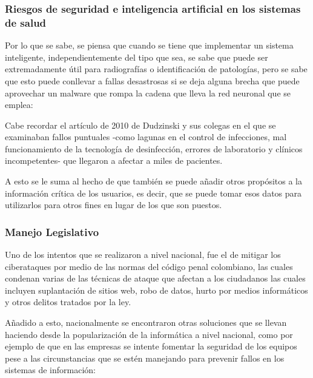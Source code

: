 \subsubsection{
  Riesgos de seguridad e inteligencia artificial en los sistemas de salud
}

Por lo que se sabe, se piensa que cuando se tiene que implementar un sistema
inteligente, independientemente del tipo que sea, se sabe que puede ser
extremadamente útil para radiografías o identificación de patologías, pero se
sabe que esto puede conllevar a fallas desastrosas si se deja alguna brecha que
puede aprovechar un malware que rompa la cadena que lleva la red neuronal que
se emplea:

\begin{displayquote}
  Cabe recordar el artículo de 2010 de Dudzinski y sus colegas en el que se
  examinaban fallos puntuales -como lagunas en el control de infecciones, mal
  funcionamiento de la tecnología de desinfección, errores de laboratorio y
  clínicos incompetentes- que llegaron a afectar a miles de pacientes.
  \parencite{Banja2020}
\end{displayquote}

A esto se le suma al hecho de que también se puede añadir otros propósitos a la
información crítica de los usuarios, es decir, que se puede tomar esos datos
para utilizarlos para otros fines en lugar de los que son puestos.
\parencite{Banja2020}

\subsubsection{Manejo Legislativo}

Uno de los intentos que se realizaron a nivel nacional, fue el de mitigar los
ciberataques por medio de las normas del código penal colombiano, las cuales
condenan varias de las técnicas de ataque que afectan a los ciudadanos las
cuales incluyen suplantación de sitios web, robo de datos, hurto por medios
informáticos y otros delitos tratados por la ley. \parencite[Ley 1273 de 2009.
Por medio de la cual se modifica el Código Penal, se crea un nuevo bien jurídico
tutelado - denominado “de la protección de la información y de los datos”- y se
preservan integralmente los sistemas que utilicen las tecnologías de la
información y las comunicaciones, entre otras disposiciones. 5 de enero de 2009.
D.O. No. 47223, como se cita en][]{Mosquera2019}

Añadido a esto, nacionalmente se encontraron otras soluciones que se llevan
haciendo desde la popularización de la informática a nivel nacional, como por
ejemplo de que en las empresas se intente fomentar la seguridad de los equipos
pese a las circunstancias que se estén manejando para prevenir fallos en los
sistemas de información:

